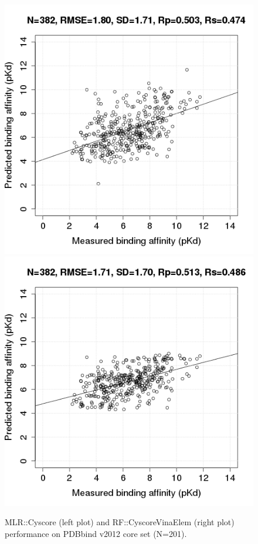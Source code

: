\documentclass[journal=jacsat,manuscript=article]{achemso}
\begin{document}
\begin{figure}
\includegraphics[width=1.4\linewidth,natwidth=480,natheight=480]{../rfcyscore/x4/mlr/trn-247-tst-382-yp.png}
\endminipage\hfill
{}
\includegraphics[width=1.4\linewidth,natwidth=480,natheight=480]{../rfcyscore/x46/rf/trn-2897-tst-382-yp.png}
\endminipage\hfill
\caption{MLR::Cyscore (left plot) and RF::CyscoreVinaElem (right plot) performance on PDBbind v2012 core set (N=201).}
\label{fig:tst201}
\end{figure}
\end{document}
